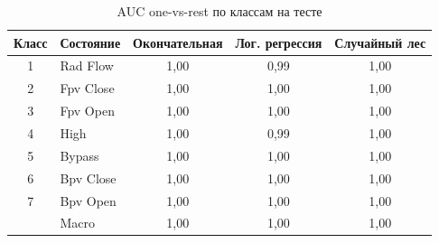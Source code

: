 \begin{table}[H]
\centering
\small
\caption{AUC one-vs-rest по классам на тесте}\label{tab:auc}
\begin{tabular}{clccc}
\toprule
Класс & Состояние & Окончательная & Лог. регрессия & Случайный лес \\
\midrule
1 & Rad Flow & 1,00 & 0,99 & 1,00 \\
2 & Fpv Close & 1,00 & 1,00 & 1,00 \\
3 & Fpv Open & 1,00 & 1,00 & 1,00 \\
4 & High & 1,00 & 0,99 & 1,00 \\
5 & Bypass & 1,00 & 1,00 & 1,00 \\
6 & Bpv Close & 1,00 & 1,00 & 1,00 \\
7 & Bpv Open & 1,00 & 1,00 & 1,00 \\
\midrule
 & Macro & 1,00 & 1,00 & 1,00 \\
\bottomrule
\end{tabular}
\end{table}
